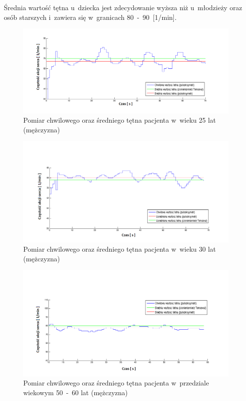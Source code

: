 \noindent Średnia wartość tętna u~dziecka jest zdecydowanie wyższa niż u~młodzieży oraz osób starszych i~zawiera się w~granicach 
80~-~90~[1/min]. 
\begin{figure}[!h]
	\centerline{\includegraphics[scale = 0.6]{graphic/25L}}
	\caption{Pomiar chwilowego oraz średniego tętna pacjenta w~wieku 25 lat (mężczyzna)}
	\label{rys:25L}
\end{figure}
\newpage
\begin{figure}[!ht]
	\centerline{\includegraphics[scale = 0.6]{graphic/30L}}
	\caption{Pomiar chwilowego oraz średniego tętna pacjenta w~wieku 30 lat (mężczyzna)}
	\label{rys:30L}
\end{figure}
\begin{figure}[!hb]
	\centerline{\includegraphics[scale = 0.6]{graphic/50-60M}}
	\caption{Pomiar chwilowego oraz średniego tętna pacjenta w~przedziale wiekowym 50~-~60 lat (mężczyzna)}
	\label{rys:50-60M}
\end{figure}
